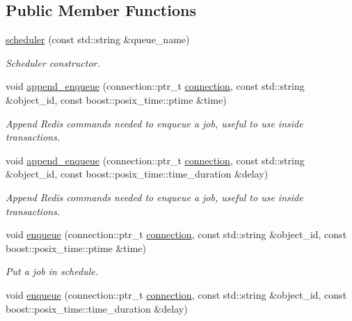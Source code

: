 \subsection*{Public Member Functions}
\begin{DoxyCompactItemize}
\item 
\hyperlink{classredis3m_1_1patterns_1_1scheduler_af1443d367272951cd84e994774612dcf}{scheduler} (const std\-::string \&queue\-\_\-name)
\begin{DoxyCompactList}\small\item\em Scheduler constructor. \end{DoxyCompactList}\item 
void \hyperlink{classredis3m_1_1patterns_1_1scheduler_aa135834d88c1ec7d68dcae36cf843a4b}{append\-\_\-enqueue} (connection\-::ptr\-\_\-t \hyperlink{classredis3m_1_1connection}{connection}, const std\-::string \&object\-\_\-id, const boost\-::posix\-\_\-time\-::ptime \&time)
\begin{DoxyCompactList}\small\item\em Append Redis commands needed to enqueue a job, useful to use inside transactions. \end{DoxyCompactList}\item 
void \hyperlink{classredis3m_1_1patterns_1_1scheduler_a2d6d1df91fb760b0202fe02d34ea7281}{append\-\_\-enqueue} (connection\-::ptr\-\_\-t \hyperlink{classredis3m_1_1connection}{connection}, const std\-::string \&object\-\_\-id, const boost\-::posix\-\_\-time\-::time\-\_\-duration \&delay)
\begin{DoxyCompactList}\small\item\em Append Redis commands needed to enqueue a job, useful to use inside transactions. \end{DoxyCompactList}\item 
void \hyperlink{classredis3m_1_1patterns_1_1scheduler_aebeb86b14442dd0441f12de25b15747d}{enqueue} (connection\-::ptr\-\_\-t \hyperlink{classredis3m_1_1connection}{connection}, const std\-::string \&object\-\_\-id, const boost\-::posix\-\_\-time\-::ptime \&time)
\begin{DoxyCompactList}\small\item\em Put a job in schedule. \end{DoxyCompactList}\item 
void \hyperlink{classredis3m_1_1patterns_1_1scheduler_a7145ca9c64ad32a7feb6f11e84fff47b}{enqueue} (connection\-::ptr\-\_\-t \hyperlink{classredis3m_1_1connection}{connection}, const std\-::string \&object\-\_\-id, const boost\-::posix\-\_\-time\-::time\-\_\-duration \&delay)

\end{DoxyCompactItemize}
